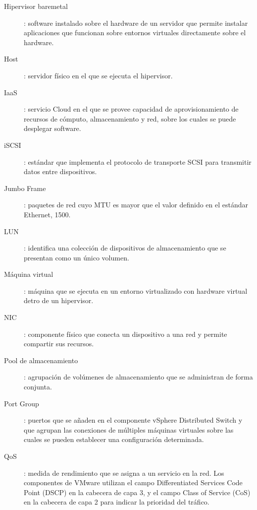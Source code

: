 \begin{description}
  \label{itm:datastore}
  \item [Hipervisor baremetal]: software instalado sobre el hardware de un servidor que permite instalar aplicaciones que funcionan sobre entornos virtuales directamente sobre el hardware.
  \label{itm:baremetal}
  \item [Host]: servidor físico en el que se ejecuta el hipervisor.
  \label{itm:host}
  \item [IaaS]\cite{computing}: servicio Cloud en el que se provee capacidad de aprovisionamiento de recursos de cómputo, almacenamiento y red, sobre los cuales se puede desplegar software.
  \label{itm:iaas}
  \item [iSCSI]: estándar que implementa el protocolo de transporte SCSI para transmitir datos entre dispositivos.
  \label{iscsi}
  \item [Jumbo Frame]\cite{jumbo-frames}: paquetes de red cuyo MTU es mayor que el valor definido en el estándar Ethernet, 1500.
  \label{itm:jumboframe}
  \item [LUN]: identifica una colección de dispositivos de almacenamiento que se presentan como un único volumen.
  \label{itm:lun}
  \item [Máquina virtual]: máquina que se ejecuta en un entorno virtualizado con hardware virtual detro de un hipervisor.
  \label{itm:vm}
 \item [NIC]: componente físico que conecta un dispositivo a una red y permite compartir sus recursos.
 \label{itm:nic}
 \item [Pool de almacenamiento]: agrupación de volúmenes de almacenamiento que se administran de forma conjunta.
 \label{itm:pool-almacenamiento}
 \item [Port Group]: puertos que se añaden en el componente vSphere Distributed Switch y que agrupan las conexiones de múltiples máquinas virtuales sobre las cuales se pueden establecer una configuración determinada.
 \item [QoS]: medida de rendimiento que se asigna a un servicio en la red. Los componentes de VMware utilizan el campo Differentiated Services Code Point (DSCP) en la cabecera de capa 3, y el campo Class of Service (CoS) en la cabecera de capa 2 para indicar la prioridad del tráfico.

\end{description}
